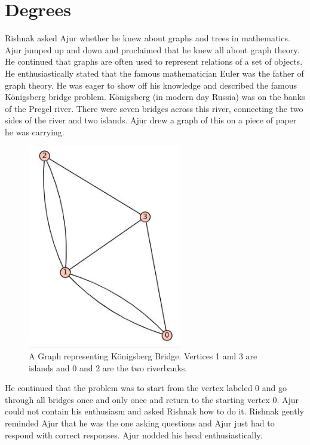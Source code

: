 \chapter{Degrees}
Rishnak asked Ajur whether he knew about graphs and trees in mathematics. Ajur jumped up and down and proclaimed that he knew all about graph theory. He continued that graphs are often used to  represent relations of a set of objects. He enthusiastically stated that the famous mathematician Euler was the father of graph theory. He was eager to show off his knowledge and described the famous  K\"{o}nigsberg bridge problem.  K\"{o}nigsberg (in modern day Russia) was on the banks of the Pregel river.  There were seven bridges across this river, connecting the two sides of the river and two islands. Ajur drew a graph of this on a piece of paper he was carrying.
\begin{figure}
\begin{center}
\includegraphics[width=0.6\textwidth]{konigsberg.JPG}
\caption{A Graph representing K\"{o}nigsberg Bridge. Vertices 1 and 3 are islands and 0 and 2 are the two riverbanks.}\label{kon}
\end{center}
\end{figure}

He continued that the problem was to start from the vertex labeled 0 and go through all bridges once and only once and return to the starting vertex 0. Ajur could not contain his enthusiasm and asked Rishnak how to do it. Rishnak gently reminded Ajur that he was the one asking questions and Ajur just had to respond with correct responses. Ajur nodded his head enthusiastically.

